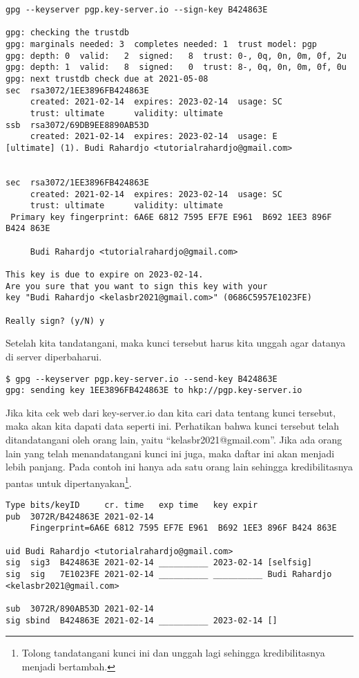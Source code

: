 \begin{verbatim}
gpg --keyserver pgp.key-server.io --sign-key B424863E

gpg: checking the trustdb
gpg: marginals needed: 3  completes needed: 1  trust model: pgp
gpg: depth: 0  valid:   2  signed:   8  trust: 0-, 0q, 0n, 0m, 0f, 2u
gpg: depth: 1  valid:   8  signed:   0  trust: 8-, 0q, 0n, 0m, 0f, 0u
gpg: next trustdb check due at 2021-05-08
sec  rsa3072/1EE3896FB424863E
     created: 2021-02-14  expires: 2023-02-14  usage: SC  
     trust: ultimate      validity: ultimate
ssb  rsa3072/69DB9EE8890AB53D
     created: 2021-02-14  expires: 2023-02-14  usage: E   
[ultimate] (1). Budi Rahardjo <tutorialrahardjo@gmail.com>


sec  rsa3072/1EE3896FB424863E
     created: 2021-02-14  expires: 2023-02-14  usage: SC  
     trust: ultimate      validity: ultimate
 Primary key fingerprint: 6A6E 6812 7595 EF7E E961  B692 1EE3 896F B424 863E

     Budi Rahardjo <tutorialrahardjo@gmail.com>

This key is due to expire on 2023-02-14.
Are you sure that you want to sign this key with your
key "Budi Rahardjo <kelasbr2021@gmail.com>" (0686C5957E1023FE)

Really sign? (y/N) y
\end{verbatim}

Setelah kita tandatangani, maka kunci tersebut harus kita unggah agar
datanya di server diperbaharui.

\begin{verbatim}
$ gpg --keyserver pgp.key-server.io --send-key B424863E
gpg: sending key 1EE3896FB424863E to hkp://pgp.key-server.io
\end{verbatim}

Jika kita cek web dari key-server.io dan kita cari data tentang kunci tersebut,
maka akan kita dapati data seperti ini. Perhatikan bahwa kunci tersebut
telah ditandatangani oleh orang lain, yaitu ``kelasbr2021@gmail.com''.
Jika ada orang lain yang telah menandatangani kunci ini juga, maka daftar
ini akan menjadi lebih panjang.
Pada contoh ini hanya ada satu orang lain sehingga kredibilitasnya pantas
untuk dipertanyakan\footnote{Tolong tandatangani kunci ini dan unggah lagi
sehingga kredibilitasnya menjadi bertambah.}.

\begin{verbatim}
Type bits/keyID     cr. time   exp time   key expir
pub  3072R/B424863E 2021-02-14            
	 Fingerprint=6A6E 6812 7595 EF7E E961  B692 1EE3 896F B424 863E 

uid Budi Rahardjo <tutorialrahardjo@gmail.com>
sig  sig3  B424863E 2021-02-14 __________ 2023-02-14 [selfsig]
sig  sig   7E1023FE 2021-02-14 __________ __________ Budi Rahardjo <kelasbr2021@gmail.com>

sub  3072R/890AB53D 2021-02-14            
sig sbind  B424863E 2021-02-14 __________ 2023-02-14 []
\end{verbatim}


